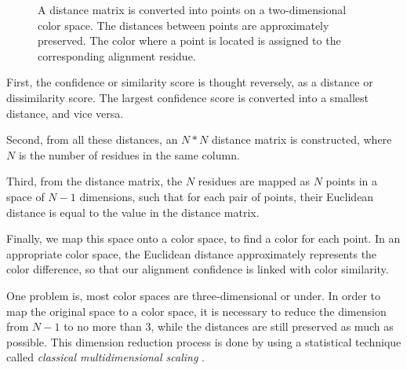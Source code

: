 \begin{figure}[hbt]
\caption[Conversion from Distance Matrix into Colors]{A distance matrix is converted into points on a two-dimensional color space. The distances between points are approximately preserved. The color where a point is located is assigned to the corresponding alignment residue.}\label{fig:chap2_color}
\end{figure}

First, the confidence or similarity score is thought reversely, as a distance or dissimilarity score. The largest confidence score is converted into a smallest distance, and vice versa.

Second, from all these distances, an $N*N$ distance matrix is constructed, where $N$ is the number of residues in the same column.

Third, from the distance matrix, the $N$ residues are mapped as $N$ points in a space of $N-1$ dimensions, such that for each pair of points, their Euclidean distance is equal to the value in the distance matrix.

Finally, we map this space onto a color space, to find a color for each point. In an appropriate color space, the Euclidean distance approximately represents the color difference, so that our alignment confidence is linked with color similarity.

One problem is, most color spaces are three-dimensional or under. In order to map the original space to a color space, it is necessary to reduce the dimension from $N-1$ to no more than 3, while the distances are still preserved as much as possible. This dimension reduction process is done by using a statistical technique called \emph{classical multidimensional scaling} \cite{Borg:1997aa}.

